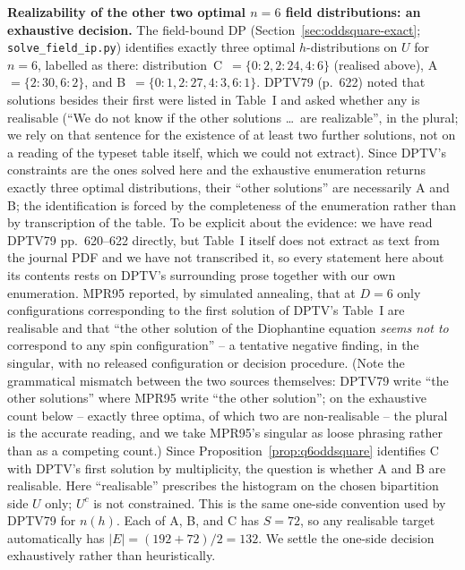 \documentclass[12pt,a4paper]{article}
\theoremstyle{definition}
\begin{document}
\noindent\textbf{Realizability of the other two optimal $n=6$ field
distributions: an exhaustive decision.} The field-bound DP
(Section~\ref{sec:oddsquare-exact}; \texttt{solve\_field\_ip.py}) identifies
exactly three optimal $h$-distributions on $U$ for $n=6$, labelled as there:
distribution~C~$=\{0{:}2,2{:}24,4{:}6\}$ (realised above),
A~$=\{2{:}30,6{:}2\}$, and B~$=\{0{:}1,2{:}27,4{:}3,6{:}1\}$.
DPTV79 (p.~622) noted that solutions besides their first were listed in
Table~I and asked whether any is realisable (``We do not know if the other
solutions \ldots\ are realizable'', in the plural; we rely on that sentence for
the existence of at least two further solutions, not on a reading of the
typeset table itself, which we could not extract). Since DPTV's constraints
are the ones solved here and the exhaustive enumeration returns exactly three
optimal distributions, their ``other solutions'' are necessarily A and B; the
identification is forced by the completeness of the enumeration rather than by
transcription of the table. To be explicit about the evidence: we have read DPTV79 pp.~620--622 directly, but Table~I itself does not extract as text from the journal PDF and we have not transcribed it, so every statement here about its contents rests on DPTV's surrounding prose together with our own enumeration. MPR95 reported, by simulated
annealing, that at $D=6$ only configurations corresponding to the first solution
of DPTV's Table~I are realisable and that ``the other solution of the Diophantine
equation \emph{seems not to} correspond to any spin configuration'' -- a
tentative negative finding, in the singular, with no released configuration or
decision procedure. (Note the grammatical mismatch between the two sources
themselves: DPTV79 write ``the other solutions'' where MPR95 write ``the
other solution''; on the exhaustive count below -- exactly three optima, of
which two are non-realisable -- the plural is the accurate reading, and we
take MPR95's singular as loose phrasing rather than as a competing count.)
Since Proposition~\ref{prop:q6oddsquare} identifies
C with DPTV's first solution by multiplicity, the question is whether A and B
are realisable. Here ``realisable'' prescribes the histogram on the chosen
bipartition side $U$ only; $U^c$ is not constrained. This is the same one-side
convention used by DPTV79 for $n(h)$. Each of A, B, and C has $S=72$, so any
realisable target automatically has $|E|=(192+72)/2=132$. We settle the
one-side decision exhaustively rather than heuristically.
\end{document}
